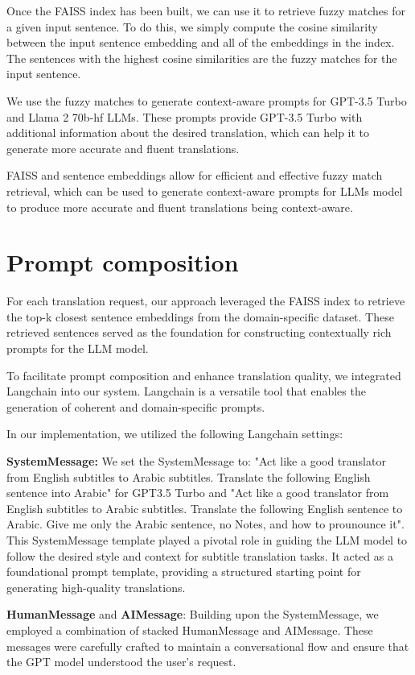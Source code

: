 \documentclass[twocolumn]{article}
\begin{document}
Once the FAISS index has been built, we can use it to retrieve fuzzy matches for a given input sentence. To do this, we simply compute the cosine similarity between the input sentence embedding and all of the embeddings in the index. The sentences with the highest cosine similarities are the fuzzy matches for the input sentence.

We use the fuzzy matches to generate context-aware prompts for GPT-3.5 Turbo and Llama 2 70b-hf LLMs. These prompts provide GPT-3.5 Turbo with additional information about the desired translation, which can help it to generate more accurate and fluent translations.

FAISS and sentence embeddings allow for efficient and effective fuzzy match retrieval, which can be used to generate context-aware prompts for LLMs model to produce more accurate and fluent translations being context-aware.


\section{Prompt composition}

For each translation request, our approach leveraged the FAISS index to retrieve the top-k closest sentence embeddings from the domain-specific dataset. These retrieved sentences served as the foundation for constructing contextually rich prompts for the LLM model.


To facilitate prompt composition and enhance translation quality, we integrated Langchain into our system. Langchain is a versatile tool that enables the generation of coherent and domain-specific prompts. 

In our implementation, we utilized the following Langchain settings:

\textbf{SystemMessage:} We set the SystemMessage to: "Act like a good translator from English subtitles to Arabic subtitles. Translate the following English sentence into Arabic" for GPT3.5 Turbo and "Act like a good translator from English subtitles to Arabic subtitles. Translate the following English sentence to Arabic. Give me only the Arabic sentence, no Notes, and how to prounounce it". This SystemMessage template played a pivotal role in guiding the LLM model to follow the desired style and context for subtitle translation tasks. It acted as a foundational prompt template, providing a structured starting point for generating high-quality translations.


\textbf{HumanMessage} and \textbf{AIMessage}: Building upon the SystemMessage, we employed a combination of stacked HumanMessage and AIMessage. These messages were carefully crafted to maintain a conversational flow and ensure that the GPT model understood the user’s request.
\end{document}
